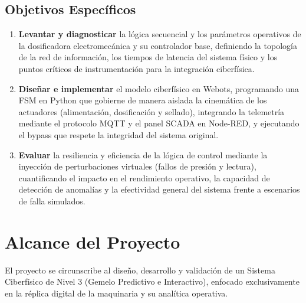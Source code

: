 \subsection{Objetivos Específicos}
\begin{enumerate}
  \item \textbf{Levantar y diagnosticar} la lógica secuencial y los parámetros operativos de la dosificadora electromecánica y su controlador base, definiendo la topología de la red de información, los tiempos de latencia del sistema físico y los puntos críticos de instrumentación para la integración ciberfísica.
  \item \textbf{Diseñar e implementar} el modelo ciberfísico en Webots, programando una FSM en Python que gobierne de manera aislada la cinemática de los actuadores (alimentación, dosificación y sellado), integrando la telemetría mediante el protocolo MQTT y el panel SCADA en Node-RED, y ejecutando el bypass que respete la integridad del sistema original.
  \item \textbf{Evaluar} la resiliencia y eficiencia de la lógica de control mediante la inyección de perturbaciones virtuales (fallos de presión y lectura), cuantificando el impacto en el rendimiento operativo, la capacidad de detección de anomalías y la efectividad general del sistema frente a escenarios de falla simulados.
\end{enumerate}

\section{Alcance del Proyecto}
El proyecto se circunscribe al diseño, desarrollo y validación de un Sistema Ciberfísico de Nivel 3 (Gemelo Predictivo e Interactivo), enfocado exclusivamente en la réplica digital de la maquinaria y su analítica operativa.

